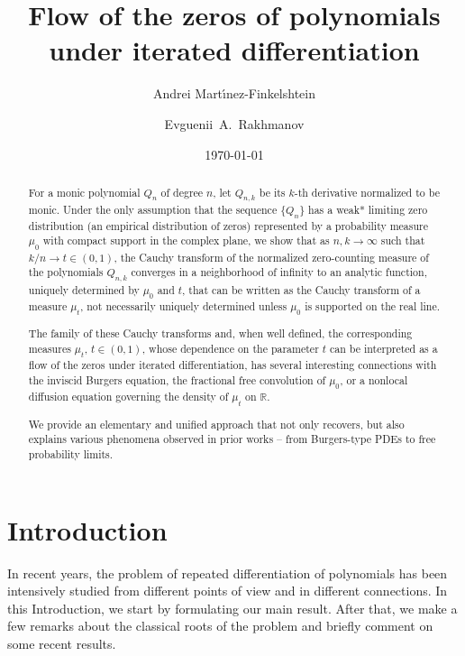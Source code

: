 \documentclass[reqno,11pt]{amsart}
\title[Flow of the zeros of derivatives]{Flow of the zeros of polynomials under iterated differentiation }
\author[A.~Mart\'{\i}nez-Finkelshtein]{Andrei Mart\'{\i}nez-Finkelshtein}
\author[E.~A.~Rakhmanov]{Evguenii~A.~Rakhmanov}
\date{\today}
\theoremstyle{plain}
\theoremstyle{definition}
\theoremstyle{remark}
\numberwithin{equation}{section}
\numberwithin{equation}{section}
\newcommand{\R}{\mathbb{R}}
\begin{document}
\begin{abstract}
For a monic polynomial $Q_n$ of degree $n$, let $Q_{n, k}$ be its $k$-th derivative normalized to be monic. Under the only assumption that the sequence $\{Q_n\}$ has a weak* limiting zero distribution (an empirical distribution of zeros) represented by a probability measure $\mu_0$ with compact support in the complex plane, we show that as $n, k \rightarrow \infty$ such that $k / n \rightarrow t \in(0,1)$, the Cauchy transform of the normalized zero-counting measure of the polynomials $Q_{n, k}$ converges in a neighborhood of infinity to an analytic function, uniquely determined by $\mu_0$ and $t$, that can be written as the Cauchy transform of a measure $\mu_t$, not necessarily uniquely determined unless $\mu_0$ is supported on the real line.

The family of these Cauchy transforms and, when well defined, the corresponding measures $\mu_t $, $t \in(0,1)$, whose dependence on the parameter $t$ can be interpreted as a flow of the zeros under iterated differentiation, has several interesting connections with the inviscid Burgers equation, the fractional free convolution of $\mu_0$, or a nonlocal diffusion equation governing the density of $\mu_t$ on $\R$. 

We provide an elementary and unified approach that not only recovers, but also explains various phenomena observed in prior works -- from Burgers-type PDEs to free probability limits.
\end{abstract}

\maketitle

\section{Introduction} \label{sec:intro}

In recent years, the problem of repeated differentiation of polynomials has been intensively studied from different points of view and in different connections. In this Introduction, we start by formulating our main result. After that, we make a few remarks about the classical roots of the problem and briefly comment on some recent results.
\end{document}
